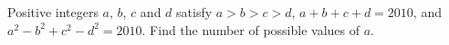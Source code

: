Positive integers $a$, $b$, $c$ and $d$ satisfy $a>b>c>d$, $a+b+c+d=2010$, and $a^2-b^2+c^2-d^2=2010$. Find the number of possible values of $a$.

